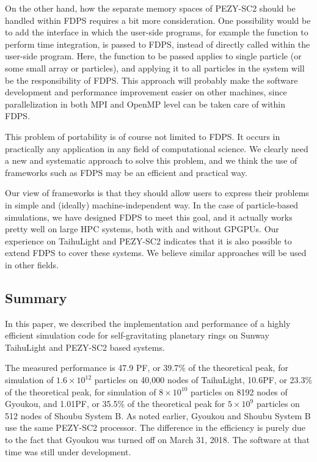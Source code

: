 \documentclass[Afour,sageh,times]{sagej}
\begin{document}
On the other hand, how the separate memory spaces of PEZY-SC2 should
be handled within FDPS requires a bit more consideration. One
possibility would be to add the interface in which the user-side
programs, for example the function to perform time integration, is
passed to FDPS, instead of directly called within the user-side
program. Here, the function to be passed applies to single particle
(or some small array or particles), and applying it to all particles
in the system will be the responsibility of FDPS.  This approach will
probably make the software development and performance improvement
easier on other machines, since parallelization in both MPI and OpenMP
level can be taken care of within FDPS.

This problem of portability is of course not limited to FDPS. It
occurs in practically any application in any field of computational
science. We clearly need a new and systematic approach to solve this
problem, and we think the use of frameworks such as FDPS may be an
efficient and practical way.

Our view of frameworks is that they should allow users to express
their problems in simple and (ideally) machine-independent way. In the
case of particle-based simulations, we have designed FDPS to meet this
goal, and it actually works pretty well on large HPC systems, both
with and without GPGPUs. Our experience on TaihuLight and PEZY-SC2
indicates that it is also possible to extend FDPS to cover these
systems. We believe similar approaches will be used in other fields.


\subsection{Summary}

In this paper, we described the implementation and performance of a
highly efficient simulation code for self-gravitating planetary rings
on Sunway TaihuLight and PEZY-SC2 based systems.

The measured performance is 47.9 PF, or 39.7\% of the theoretical
peak, for simulation of $1.6\times 10^{12}$ particles on 40,000 nodes
of TaihuLight, 10.6PF, or 23.3\% of the theoretical peak, for
simulation of $8\times 10^{10}$ particles on 8192 nodes of Gyoukou,
and 1.01PF, or 35.5\% of the theoretical peak for $5\times 10^{9}$
particles on 512 nodes of Shoubu System B. As noted earlier, Gyoukou
and Shoubu System B use the same PEZY-SC2 processor. The difference in
the efficiency is purely due to the fact that Gyoukou was turned off
on March 31, 2018. The software at that time was still under
development.
\end{document}
